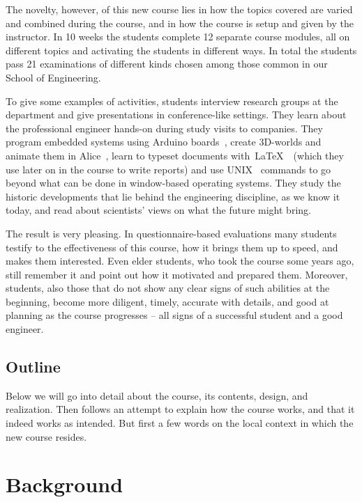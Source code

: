 \documentclass[conference]{IEEEtran}
\begin{document}
The novelty, however, of this new course lies in how the topics covered are varied and combined during the course, and in how the course is setup and given by the instructor. In 10 weeks the students complete 12 separate course modules, all on different topics and activating the students in different ways. In total the students pass 21 examinations of different kinds chosen among those common in our School of Engineering.

To give some examples of activities, students interview research groups at the department and give presentations in conference-like settings. They learn about the professional engineer hands-on during study visits to companies. They program embedded systems using Arduino boards~\cite{arduino}, create 3D-worlds and animate them in Alice~\cite{DBLP:conf/chi/ConwayABCC00}, learn to typeset documents with\ LaTeX~\cite{DBLP:books/aw/Lamport86}~(which they use later on in the course to write reports) and use UNIX~\cite{Ritchie78} commands to go beyond what can be done in window-based operating systems. They study the historic developments that lie behind the engineering discipline, as we know it today, and read about scientists’ views on what the future might bring.

The result is very pleasing. In questionnaire-based evaluations many students testify to the effectiveness of this course, how it brings them up to speed, and makes them interested. Even elder students, who took the course some years ago, still remember it and point out how it motivated and prepared them. Moreover, students, also those that do not show any clear signs of such abilities at the beginning, become more diligent, timely, accurate with details, and good at planning as the course progresses – all signs of a successful student and a good engineer.

\subsection{Outline}

Below we will go into detail about the course, its contents, design, and realization. Then follows an attempt to explain how the course works, and that it indeed works as intended. But first a few words on the local context in which the new course resides. 

\section{Background}\label{sect:back} 
\end{document}
